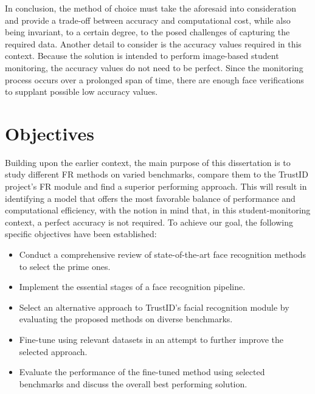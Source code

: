 \documentclass[class=report, crop=false, a4paper, 12pt]{standalone}
\begin{document}
\par In conclusion, the method of choice must take the aforesaid into consideration and provide a trade-off between accuracy and computational cost, while also being invariant, to a certain degree, to the posed challenges of capturing the required data. Another detail to consider is the accuracy values required in this context. Because the solution is intended to perform image-based student monitoring, the accuracy values do not need to be perfect. Since the monitoring process occurs over a prolonged span of time, there are enough face verifications to supplant possible low accuracy values.

\section{Objectives}
Building upon the earlier context, the main purpose of this dissertation is to study different \gls{FR} methods on varied benchmarks, compare them to the TrustID project's FR module and find a superior performing approach. This will result in identifying a model that offers the most favorable balance of performance and computational efficiency, with the notion in mind that, in this student-monitoring context, a perfect accuracy is not required. To achieve our goal, the following specific objectives have been established:
\begin{itemize}
    \item Conduct a comprehensive review of state-of-the-art face recognition methods to select the prime ones.
    \item Implement the essential stages of a face recognition pipeline.
    \item Select an alternative approach to TrustID's facial recognition module by evaluating the proposed methods on diverse benchmarks.
    \item Fine-tune using relevant datasets in an attempt to further improve the selected approach.
    \item Evaluate the performance of the fine-tuned method using selected benchmarks and discuss the overall best performing solution.
\end{itemize}
\end{document}
